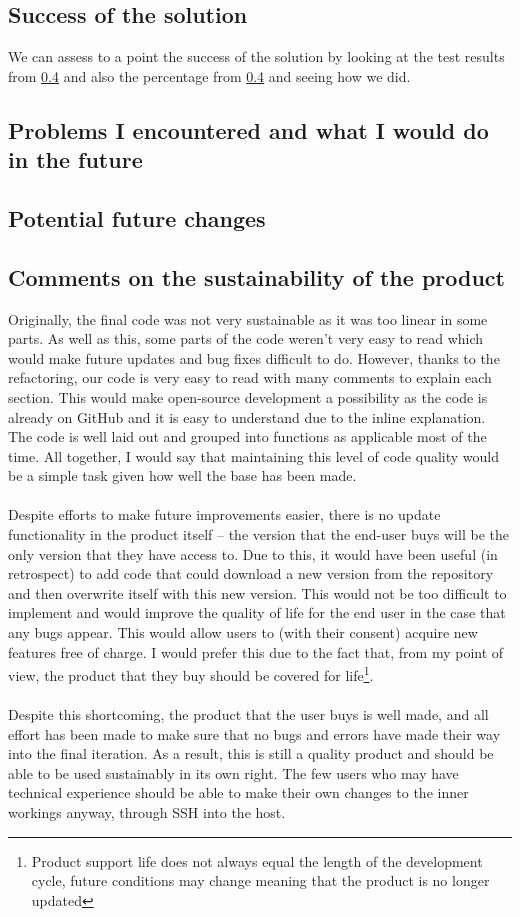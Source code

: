 \documentclass[9pt]{article}
\begin{document}
\subsection{Success of the solution}
We can assess to a point the success of the solution by looking at the test results from \ref{} and also the percentage from \ref{} and seeing how we did.

\subsection{Problems I encountered and what I would do in the future}

\subsection{Potential future changes}


\subsection{Comments on the sustainability of the product}
Originally, the final code was not very sustainable as it was too linear in some parts. As well as this, some parts of the code weren't very easy to read which would make future updates and bug fixes difficult to do. However, thanks to the refactoring, our code is very easy to read with many comments to explain each section. This would make open-source development a possibility as the code is already on GitHub and it is easy to understand due to the inline explanation. The code is well laid out and grouped into functions as applicable most of the time. All together, I would say that maintaining this level of code quality would be a simple task given how well the base has been made.\\\\
Despite efforts to make future improvements easier, there is no update functionality in the product itself -- the version that the end-user buys will be the only version that they have access to. Due to this, it would have been useful (in retrospect) to add code that could download a new version from the repository and then overwrite itself with this new version. This would not be too difficult to implement and would improve the quality of life for the end user in the case that any bugs appear. This would allow users to (with their consent) acquire new features free of charge. I would prefer this due to the fact that, from my point of view, the product that they buy should be covered for life\footnote{Product support life does not always equal the length of the development cycle, future conditions may change meaning that the product is no longer updated}.\\\\
Despite this shortcoming, the product that the user buys is well made, and all effort has been made to make sure that no bugs and errors have made their way into the final iteration. As a result, this is still a quality product and should be able to be used sustainably in its own right. The few users who may have technical experience should be able to make their own changes to the inner workings anyway, through SSH into the host.

\newpage
{}


\newpage
\listoffigures
\end{document}
